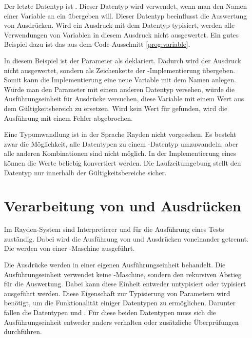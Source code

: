 \SuperPar
Der letzte Datentyp ist . Dieser Datentyp wird verwendet, wenn man den Namen einer Variable an ein  übergeben will. Dieser Datentyp beeinflusst die Auswertung von Ausdrücken. Wird ein Ausdruck mit dem Datentyp  typisiert, werden alle Verwendungen von Variablen in diesem Ausdruck nicht ausgewertet. Ein gutes Beispiel dazu ist das  aus dem Code-Ausschnitt \ref{prog:variable}.

\SuperPar
In diesem Beispiel ist der Parameter  als  deklariert. Dadurch wird der Ausdruck  nicht ausgewertet, sondern als Zeichenkette der -Implementierung übergeben. Somit kann die Implementierung eine neue Variable mit dem Namen  anlegen. Würde man den Parameter  mit einem anderen Datentyp versehen, würde die Ausführungseinheit für Ausdrücke versuchen, diese Variable mit einem Wert aus dem Gültigkeitsbereich zu ersetzen. Wird kein Wert für \enword{} gefunden, wird die Ausführung mit einem Fehler abgebrochen.

\SuperPar
Eine Typumwandlung ist in der Sprache Rayden nicht vorgesehen. Es besteht zwar die Möglichkeit, alle Datentypen zu einem -Datentyp umzuwandeln, aber alle anderen Kombinationen sind nicht möglich. In der Implementierung eines  können die Werte beliebig konvertiert werden. Die Laufzeitumgebung stellt den Datentyp nur innerhalb der Gültigkeitsbereiche sicher.

\section{Verarbeitung von  und Ausdrücken}

Im Rayden-System sind Interpretierer und  für die Ausführung eines Tests zuständig. Dabei wird die Ausführung von  und Ausdrücken voneinander getrennt. Die  werden von einer -Maschine ausgeführt. 

\SuperPar
Die Ausdrücke werden in einer eigenen Ausführungseinheit behandelt. Die Ausführungseinheit verwendet keine -Maschine, sondern den rekursiven Abstieg für die Auswertung. Dabei kann diese Einheit entweder untypisiert oder typisiert ausgeführt werden. Diese Eigenschaft zur Typisierung von Parametern wird benötigt, um die Funktionalität einiger Datentypen zu ermöglichen. Darunter fallen die Datentypen  und . Für diese beiden Datentypen muss sich die Ausführungseinheit entweder anders verhalten oder zusätzliche Überprüfungen durchführen. 

